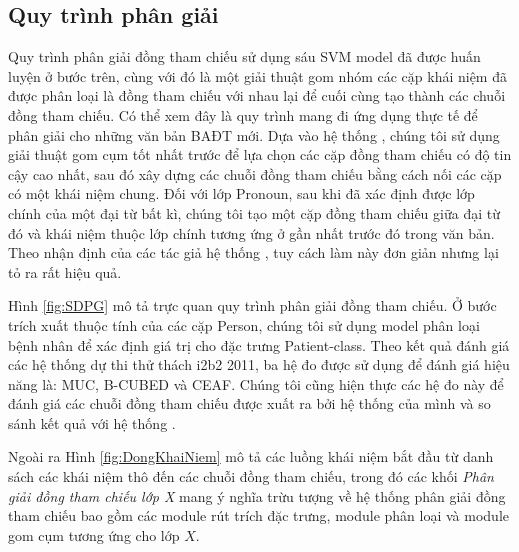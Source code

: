 \subsection*{Quy trình phân giải}
Quy trình phân giải đồng tham chiếu sử dụng sáu SVM model đã được huấn luyện ở bước trên, cùng với đó là một giải thuật gom nhóm các cặp khái niệm đã được phân loại là đồng tham chiếu với nhau lại để cuối cùng tạo thành các chuỗi đồng tham chiếu. Có thể xem đây là quy trình mang đi ứng dụng thực tế để phân giải cho những văn bản BAĐT mới. Dựa vào hệ thống \cite{YanXu2012}, chúng tôi sử dụng giải thuật gom cụm tốt nhất trước để lựa chọn các cặp đồng tham chiếu có độ tin cậy cao nhất, sau đó xây dựng các chuỗi đồng tham chiếu bằng cách nối các cặp có một khái niệm chung. Đối với lớp Pronoun, sau khi đã xác định được lớp chính của một đại từ bất kì, chúng tôi tạo một cặp đồng tham chiếu giữa đại từ đó và khái niệm thuộc lớp chính tương ứng ở gần nhất trước đó trong văn bản. Theo nhận định của các tác giả hệ thống \cite{YanXu2012}, tuy cách làm này đơn giản nhưng lại tỏ ra rất hiệu quả.

Hình \ref{fig:SDPG} mô tả trực quan quy trình phân giải đồng tham chiếu. Ở bước trích xuất thuộc tính của các cặp Person, chúng tôi sử dụng model phân loại bệnh nhân để xác định giá trị cho đặc trưng Patient-class. Theo kết quả đánh giá các hệ thống dự thi thử thách i2b2 2011, ba hệ đo được sử dụng để đánh giá hiệu năng là: MUC, B-CUBED và CEAF. Chúng tôi cũng hiện thực các hệ đo này để đánh giá các chuỗi đồng tham chiếu được xuất ra bởi hệ thống của mình và so sánh kết quả với hệ thống \cite{YanXu2012}. 

Ngoài ra Hình \ref{fig:DongKhaiNiem} mô tả các luồng khái niệm bắt đầu từ danh sách các khái niệm thô đến các chuỗi đồng tham chiếu, trong đó các khối \emph{Phân giải đồng tham chiếu lớp X} mang ý nghĩa trừu tượng về hệ thống phân giải đồng tham chiếu bao gồm các module rút trích đặc trưng, module phân loại và module gom cụm tương ứng cho lớp $X$.

